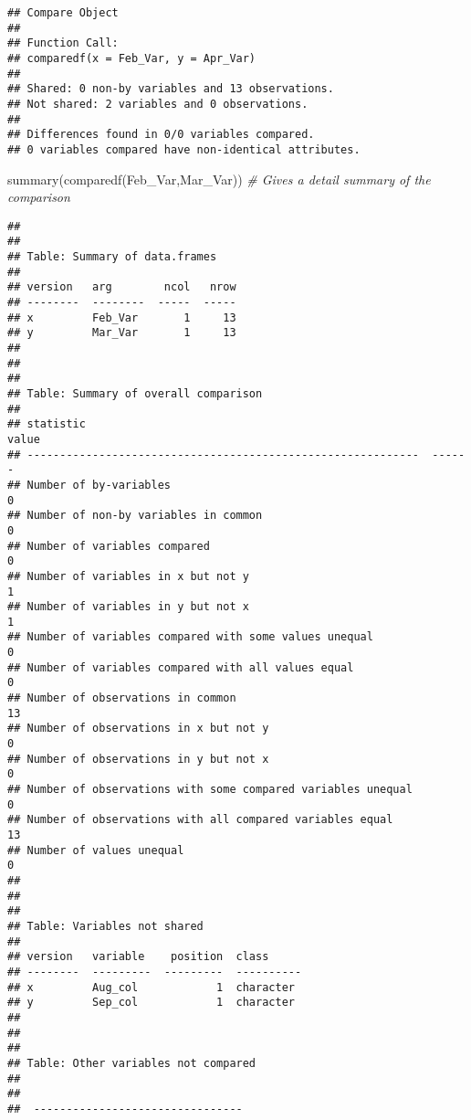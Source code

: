 \documentclass[
]{article}
\newenvironment{Shaded}{\begin{snugshade}}{\end{snugshade}}
\newcommand{\CommentTok}[1]{\textcolor[rgb]{0.56,0.35,0.01}{\textit{#1}}}
\newcommand{\FunctionTok}[1]{\textcolor[rgb]{0.00,0.00,0.00}{#1}}
\newcommand{\NormalTok}[1]{#1}
\begin{document}
\begin{verbatim}
## Compare Object
## 
## Function Call: 
## comparedf(x = Feb_Var, y = Apr_Var)
## 
## Shared: 0 non-by variables and 13 observations.
## Not shared: 2 variables and 0 observations.
## 
## Differences found in 0/0 variables compared.
## 0 variables compared have non-identical attributes.
\end{verbatim}

\begin{Shaded}
\begin{Highlighting}[]
 \FunctionTok{summary}\NormalTok{(}\FunctionTok{comparedf}\NormalTok{(Feb\_Var,Mar\_Var))  }\CommentTok{\# Gives a detail summary of the comparison}
\end{Highlighting}
\end{Shaded}

\begin{verbatim}
## 
## 
## Table: Summary of data.frames
## 
## version   arg        ncol   nrow
## --------  --------  -----  -----
## x         Feb_Var       1     13
## y         Mar_Var       1     13
## 
## 
## 
## Table: Summary of overall comparison
## 
## statistic                                                      value
## ------------------------------------------------------------  ------
## Number of by-variables                                             0
## Number of non-by variables in common                               0
## Number of variables compared                                       0
## Number of variables in x but not y                                 1
## Number of variables in y but not x                                 1
## Number of variables compared with some values unequal              0
## Number of variables compared with all values equal                 0
## Number of observations in common                                  13
## Number of observations in x but not y                              0
## Number of observations in y but not x                              0
## Number of observations with some compared variables unequal        0
## Number of observations with all compared variables equal          13
## Number of values unequal                                           0
## 
## 
## 
## Table: Variables not shared
## 
## version   variable    position  class     
## --------  ---------  ---------  ----------
## x         Aug_col            1  character 
## y         Sep_col            1  character 
## 
## 
## 
## Table: Other variables not compared
## 
##                                  
##  --------------------------------

\end{verbatim}
\end{document}
